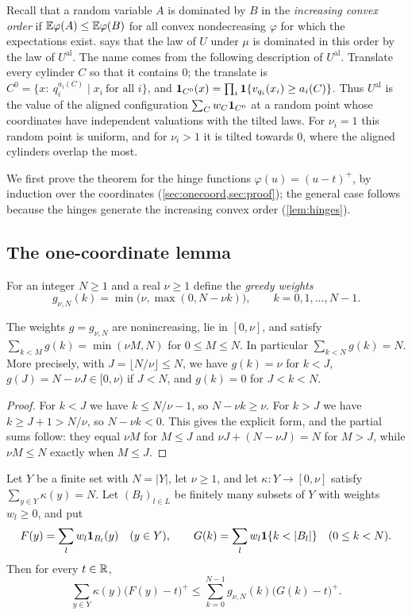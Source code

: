 Recall that a random variable $A$ is dominated by $B$ in the \emph{increasing convex order} if
$\mathbb{E}\varphi(A)\le\mathbb{E}\varphi(B)$ for all convex nondecreasing $\varphi$ for which the expectations exist.
 says that the law of $U$ under $\mu$ is dominated in this order by the law of
$U^{\mathrm{al}}$. The name comes from the following description of $U^{\mathrm{al}}$. Translate every cylinder
$C$ so that it contains $0$; the translate is $C^0=\{x:\ q_i^{a_i(C)}\mid x_i\ \text{for all } i\}$, and
$\mathbf{1}_{C^0}(x)=\prod_i\mathbf{1}\{v_{q_i}(x_i)\ge a_i(C)\}$. Thus $U^{\mathrm{al}}$ is the value of the aligned
configuration $\sum_Cw_C\mathbf{1}_{C^0}$ at a random point whose coordinates have independent valuations with the tilted
laws. For $\nu_i=1$ this random point is uniform, and for $\nu_i>1$ it is tilted towards $0$, where the aligned
cylinders overlap the most.

We first prove the theorem for the hinge functions $\varphi(u)=(u-t)^+$, by induction over the coordinates
(\cref{sec:onecoord,sec:proof}); the general case follows because the hinges generate the increasing convex order
(\cref{lem:hinges}).

\subsection{The one-coordinate lemma}\label{sec:onecoord}

For an integer $N\ge1$ and a real $\nu\ge1$ define the \emph{greedy weights}
\[
  g_{\nu,N}(k)=\min\bigl(\nu,\max(0,N-\nu k)\bigr),\qquad k=0,1,\dots,N-1 .
\]

\begin{lemma}\label{lem:greedy}
The weights $g=g_{\nu,N}$ are nonincreasing, lie in $[0,\nu]$, and satisfy $\sum_{k<M}g(k)=\min(\nu M,N)$ for
$0\le M\le N$. In particular $\sum_{k<N}g(k)=N$. More precisely, with $J=\lfloor N/\nu\rfloor\le N$, we have
$g(k)=\nu$ for $k<J$, $g(J)=N-\nu J\in[0,\nu)$ if $J<N$, and $g(k)=0$ for $J<k<N$.
\end{lemma}

\begin{proof}
For $k<J$ we have $k\le N/\nu-1$, so $N-\nu k\ge\nu$. For $k>J$ we have $k\ge J+1>N/\nu$, so $N-\nu k<0$. This
gives the explicit form, and the partial sums follow: they equal $\nu M$ for $M\le J$ and $\nu J+(N-\nu J)=N$ for
$M>J$, while $\nu M\le N$ exactly when $M\le J$.
\end{proof}

\begin{lemma}\label{lem:onecoord}
Let $Y$ be a finite set with $N=|Y|$, let $\nu\ge1$, and let $\kappa\colon Y\to[0,\nu]$ satisfy
$\sum_{y\in Y}\kappa(y)=N$. Let $(B_l)_{l\in L}$ be finitely many subsets of $Y$ with weights $w_l\ge0$, and put
\[
  F(y)=\sum_lw_l\one_{B_l}(y)\quad(y\in Y),\qquad G(k)=\sum_lw_l\one\{k<|B_l|\}\quad(0\le k<N).
\]
Then for every $t\in\mathbb{R}$,
\[
  \sum_{y\in Y}\kappa(y)\bigl(F(y)-t\bigr)^+\le\sum_{k=0}^{N-1}g_{\nu,N}(k)\bigl(G(k)-t\bigr)^+ .
\]
\end{lemma}

